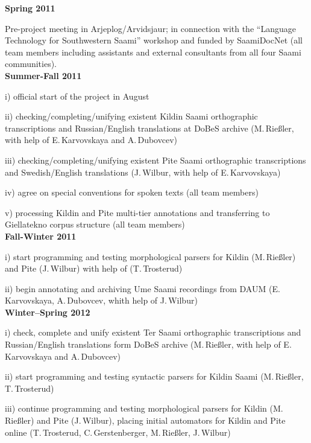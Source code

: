 \documentclass[a4paper,12pt]{article}
\begin{document}
{{\noindent \textbf{Spring 2011}

Pre-project meeting in Arjeplog/Arvidsjaur; in connection with the “Language Technology for Southwestern Saami” workshop and funded by SaamiDocNet (all team members including assistants and external consultants from all four Saami communities).\\

\noindent \textbf{Summer-Fall 2011}

i) official start of the project in August

ii) checking/completing/unifying existent Kildin Saami orthographic transcriptions and Russian/English translations at DoBeS archive (M.\,Rießler, with help of E.\,Karvovskaya and A.\,Dubovcev)

iii) checking/completing/unifying existent Pite Saami orthographic transcriptions and Swedish/English translations (J.\,Wilbur, with help of E.\,Karvovskaya)

iv) agree on special conventions for spoken texts (all team members)

v) processing Kildin and Pite multi-tier annotations and transferring to Giellatekno corpus structure (all team members)\\

\noindent \textbf{Fall-Winter 2011}

i) start programming and testing morphological parsers for Kildin (M.\,Rießler) and Pite (J.\,Wilbur) with help of (T.\,Trosterud)


ii) begin annotating and archiving Ume Saami recordings from DAUM (E.\,Karvovskaya, A.\,Dubovcev, whith help of J.\,Wilbur)\\

\noindent \textbf{Winter–Spring 2012}

i) check, complete and unify existent Ter Saami orthographic transcriptions and Russian/English translations form DoBeS archive (M.\,Rießler, with help of E.\,Karvovskaya and A.\,Dubovcev)

ii) start programming and testing syntactic parsers for Kildin Saami (M.\,Rießler, T.\,Trosterud)

iii) continue programming and testing morphological parsers for Kildin (M.\,Rießler) and Pite (J.\,Wilbur), placing initial automators for Kildin and Pite online (T.\,Trosterud, C.\,Gerstenberger, M.\,Rießler, J.\,Wilbur)

}}
\end{document}
